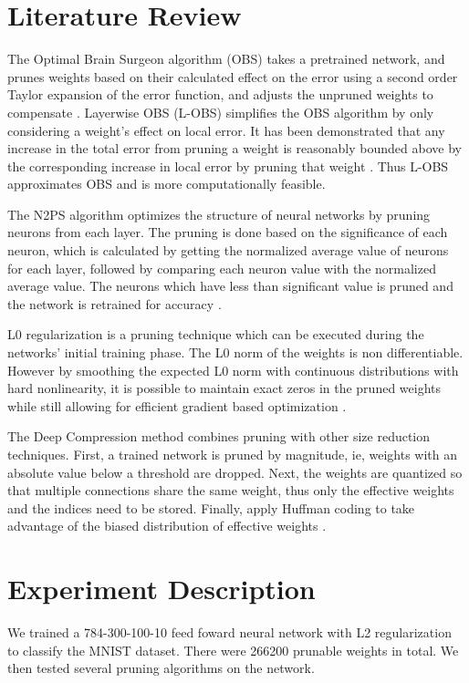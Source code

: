 \documentclass{article}
\begin{document}
\section{Literature Review}
\label{Literature Review}
The Optimal Brain Surgeon algorithm (OBS) takes a pretrained network, and prunes weights based on their calculated effect on the error using a second order Taylor expansion of the error function, and adjusts the unpruned weights to compensate \cite{Hassibi93}. Layerwise OBS (L-OBS) simplifies the OBS algorithm by only considering a weight's effect on local error. It has been demonstrated that any increase in the total error from pruning a weight is reasonably bounded above by the corresponding increase in local error by pruning that weight \cite{Dong17}. Thus L-OBS approximates OBS and is more computationally feasible.

The N2PS algorithm optimizes the structure of neural networks by pruning neurons from each layer. The pruning is done based on the significance of each neuron, which is calculated by getting the normalized average value of neurons for each layer, followed by comparing each neuron value with the normalized average value. The neurons which have less than significant value is pruned and the network is retrained for accuracy \cite{Augasta11}.

L0 regularization is a pruning technique which can be executed during the networks' initial training phase. The L0 norm of the weights is non differentiable. However by smoothing the expected L0 norm with continuous distributions with hard nonlinearity, it is possible to maintain exact zeros in the pruned weights while still allowing for efficient gradient based optimization \cite{Louizos17}. 

The Deep Compression method combines pruning with other size reduction techniques. First, a trained network is pruned by magnitude, ie, weights with an absolute value below a threshold are dropped.        Next, the weights are quantized so that multiple connections share the same weight, thus only the effective weights and the indices need to be stored. Finally, apply Huffman coding to take advantage of the biased distribution of effective weights \cite{Han15}.

\section{Experiment Description}
\label{Experiment Description} We trained a 784-300-100-10 feed foward neural network with L2 regularization to classify the MNIST dataset. There were 266200 prunable weights in total. We then tested several pruning algorithms on the network. 
\end{document}
